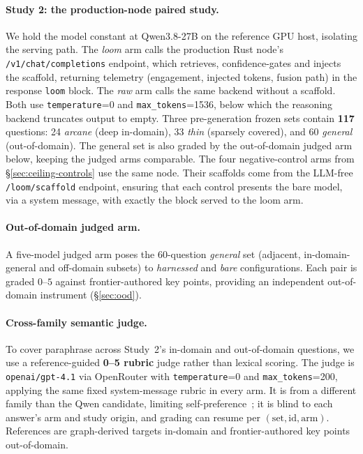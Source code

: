 \documentclass[10pt,twocolumn]{article}
\begin{document}
\paragraph{Study 2: the production-node paired study.} We hold the model constant at Qwen3.8-27B on the reference GPU host, isolating the serving path. The \emph{loom} arm calls the production Rust node's \texttt{/v1/chat/completions} endpoint, which retrieves, confidence-gates and injects the scaffold, returning telemetry (engagement, injected tokens, fusion path) in the response \texttt{loom} block. The \emph{raw} arm calls the same backend without a scaffold. Both use \texttt{temperature}=0 and \texttt{max\_tokens}=1536, below which the reasoning backend truncates output to empty. Three pre-generation frozen sets contain \textbf{117} questions: 24 \emph{arcane} (deep in-domain), 33 \emph{thin} (sparsely covered), and 60 \emph{general} (out-of-domain). The general set is also graded by the out-of-domain judged arm below, keeping the judged arms comparable. The four negative-control arms from \S\ref{sec:ceiling-controls} use the same node. Their scaffolds come from the LLM-free \texttt{/loom/scaffold} endpoint, ensuring that each control presents the bare model, via a system message, with exactly the block served to the loom arm.

\paragraph{Out-of-domain judged arm.} A five-model judged arm poses the 60-question \emph{general} set (adjacent, in-domain-general and off-domain subsets) to \emph{harnessed} and \emph{bare} configurations. Each pair is graded $0$--$5$ against frontier-authored key points, providing an independent out-of-domain instrument (\S\ref{sec:ood}).

\paragraph{Cross-family semantic judge.} To cover paraphrase across Study~2's in-domain and out-of-domain questions, we use a reference-guided \textbf{0--5 rubric} judge rather than lexical scoring. The judge is \texttt{openai/gpt-4.1} via OpenRouter with \texttt{temperature}=0 and \texttt{max\_tokens}=200, applying the same fixed system-message rubric in every arm. It is from a different family than the Qwen candidate, limiting self-preference~\cite{zheng2023judging,panickssery2024selfpreference}; it is blind to each answer's arm and study origin, and grading can resume per $(\text{set},\text{id},\text{arm})$. References are graph-derived targets in-domain and frontier-authored key points out-of-domain.
\end{document}

